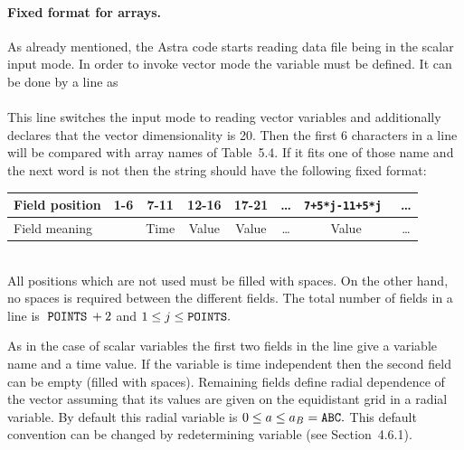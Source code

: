 \paragraph{Fixed format for arrays.} 
As already mentioned, the Astra code starts reading data file being
in the scalar input mode. 
In order to invoke vector mode the variable  must be
defined. 
It can be done by a line as
\medskip\\
\\[1ex]
This line switches the input mode to reading vector variables and
additionally declares that the vector dimensionality is 20.
Then the first 6 characters in a line will be compared with array names
of Table~5.4.
If it fits one of those name and the next word is not  
then the string should have the following fixed format:
\bigskip\\
\begin{tabular}{| l | c c c c c c c|}\hline
Field position	&1-6	&7-11	&12-16	&17-21	
&\dots		&\tt 7+5*j-11+5*j &\dots\\ \hline
Field meaning	&\twd{NAME}& Time& Value& Value	
&\dots		& Value	      &\dots\\ \hline
\end{tabular}
\bigskip\\
All positions which are not used must be filled with spaces. 
On the other hand, no spaces is required between the different fields. 
The total number of fields in a line is $\hspace*{2pt}{\tt POINTS}\hspace*{2pt}+2$ and 
$1\le j\le\tt POINTS.$ 

As in the case of scalar variables the first two fields in the line give
a variable name and a time value.
If the variable is time independent then the second field can be empty
(filled with spaces).
Remaining fields define radial dependence of the vector assuming that
its values are given on the equidistant grid in a radial variable.
By default this radial variable is $0\leq a\leq a_B=\tt ABC.$
This default convention can be changed by redetermining variable
 (see Section~4.6.1). 

